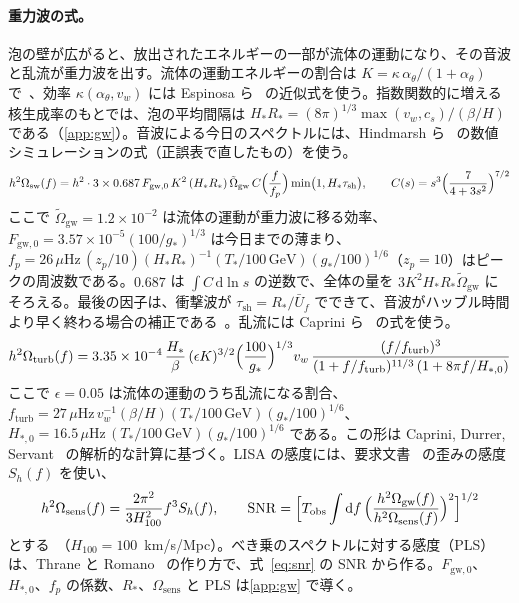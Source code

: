 \documentclass[a4paper,10pt]{ltjsarticle}
\newcommand{\dd}{\mathrm{d}}
\begin{document}
\paragraph{重力波の式。}泡の壁が広がると、放出されたエネルギーの一部が流体の運動になり、その音波と乱流が重力波を出す。流体の運動エネルギーの割合は $K=\kappa\,\alpha_\theta/(1+\alpha_\theta)$ で~\cite{caprini20}、効率 $\kappa(\alpha_\theta,v_w)$ には Espinosa ら~\cite{espinosa10} の近似式を使う。指数関数的に増える核生成率のもとでは、泡の平均間隔は $H_*R_*=(8\pi)^{1/3}\max(v_w,c_s)/(\beta/H)$ である（\ref{app:gw}）。音波による今日のスペクトルには、Hindmarsh ら~\cite{hhrw17} の数値シミュレーションの式（正誤表で直したもの）を使う。
\begin{equation}
h^2\Omega_{\mathrm{sw}}(f)=h^2\cdot3\times0.687\,F_{\mathrm{gw},0}\,K^2\,(H_*R_*)\,\tilde\Omega_{\mathrm{gw}}\,C\Bigl(\frac f{f_p}\Bigr)\min\bigl(1,H_*\tau_{\mathrm{sh}}\bigr),\qquad
C(s)=s^3\Bigl(\frac7{4+3s^2}\Bigr)^{7/2}
\label{eq:Osw}
\end{equation}
ここで $\tilde\Omega_{\mathrm{gw}}=1.2\times10^{-2}$ は流体の運動が重力波に移る効率、$F_{\mathrm{gw},0}=3.57\times10^{-5}(100/g_*)^{1/3}$ は今日までの薄まり、$f_p=26\,\mu\mathrm{Hz}\,(z_p/10)(H_*R_*)^{-1}(T_*/100\,\mathrm{GeV})(g_*/100)^{1/6}$（$z_p=10$）はピークの周波数である。$0.687$ は $\int C\,\dd\ln s$ の逆数で、全体の量を $3K^2H_*R_*\tilde\Omega_{\mathrm{gw}}$ にそろえる。最後の因子は、衝撃波が $\tau_{\mathrm{sh}}=R_*/\bar U_f$ でできて、音波がハッブル時間より早く終わる場合の補正である~\cite{caprini20}。乱流には Caprini ら~\cite{caprini16} の式を使う。
\begin{equation}
h^2\Omega_{\mathrm{turb}}(f)=3.35\times10^{-4}\,\frac{H_*}{\beta}\,(\epsilon K)^{3/2}\Bigl(\frac{100}{g_*}\Bigr)^{1/3}v_w\,
\frac{(f/f_{\mathrm{turb}})^3}{(1+f/f_{\mathrm{turb}})^{11/3}\,(1+8\pi f/H_{*,0})}
\label{eq:Oturb}
\end{equation}
ここで $\epsilon=0.05$ は流体の運動のうち乱流になる割合、$f_{\mathrm{turb}}=27\,\mu\mathrm{Hz}\,v_w^{-1}(\beta/H)(T_*/100\,\mathrm{GeV})(g_*/100)^{1/6}$、$H_{*,0}=16.5\,\mu\mathrm{Hz}\,(T_*/100\,\mathrm{GeV})(g_*/100)^{1/6}$ である。この形は Caprini, Durrer, Servant~\cite{cds09} の解析的な計算に基づく。LISA の感度には、要求文書~\cite{scird} の歪みの感度 $S_h(f)$ を使い、
\begin{equation}
h^2\Omega_{\mathrm{sens}}(f)=\frac{2\pi^2}{3H_{100}^2}f^3S_h(f),\qquad
\mathrm{SNR}=\Bigl[T_{\mathrm{obs}}\int\dd f\,\Bigl(\frac{h^2\Omega_{\mathrm{gw}}(f)}{h^2\Omega_{\mathrm{sens}}(f)}\Bigr)^2\Bigr]^{1/2}
\label{eq:snr}
\end{equation}
とする~\cite{caprini20}（$H_{100}=100$~km/s/Mpc）。べき乗のスペクトルに対する感度（PLS）は、Thrane と Romano~\cite{thrane13} の作り方で、式~\eqref{eq:snr} の SNR から作る。$F_{\mathrm{gw},0}$、$H_{*,0}$、$f_p$ の係数、$R_*$、$\Omega_{\mathrm{sens}}$ と PLS は\ref{app:gw} で導く。
\end{document}

